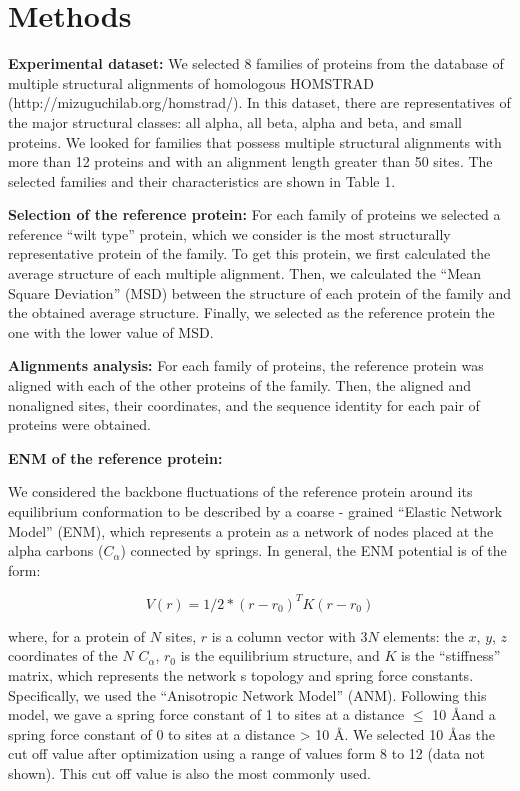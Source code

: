 \documentclass{article}
\begin{document}
\section{Methods}

{\bf Experimental dataset:}
We selected 8 families of proteins from the database of multiple structural alignments of homologous HOMSTRAD (http://mizuguchilab.org/homstrad/). In this dataset, there are representatives of the major structural classes: all alpha, all beta, alpha and beta, and small proteins. We looked for families that possess multiple structural alignments with more than 12 proteins and with an alignment length greater than 50 sites. The selected families and their characteristics are shown in Table 1.

{\bf Selection of the reference protein:}
For each family of proteins we selected a reference ``wilt type'' protein, which we consider is the most structurally representative protein of the family. To get this protein, we first calculated the average structure of each multiple alignment. Then, we calculated the ``Mean Square Deviation'' (MSD) between the structure of each protein of the family and the obtained average structure. Finally, we selected as the reference protein the one with the lower value of MSD.

{\bf Alignments analysis:}
For each family of proteins, the reference protein was aligned with each of the other proteins of the family. Then, the aligned and nonaligned sites, their coordinates, and the sequence identity for each pair of proteins were obtained. 

{\bf ENM of the reference protein:} 

We considered the backbone fluctuations of the reference protein around its equilibrium conformation to be described by a coarse - grained ``Elastic Network Model'' (ENM), which represents a protein as a network of nodes placed at the alpha carbons ($C_{\alpha}$) connected by springs. In general, the ENM potential is of the form: 

\begin{equation}
V(r) = 1/2*(r-r_{0})^{T}K(r-r_{0})
\end{equation}

where, for a protein of $N$ sites, $r$ is a column vector with $3N$ elements: the $x$, $y$, $z$ coordinates of the $N$ $C_{\alpha}$, $r_{0}$ is the equilibrium structure, and $K$ is the ``stiffness'' matrix, which represents the network\textsc{} s topology and spring force constants. 
Specifically, we used the ``Anisotropic Network Model'' (ANM). Following this model, we gave a spring force constant of 1 to sites at a distance $\leq$ 10 \AA  and a spring force constant of 0 to sites at a distance > 10 \AA. We selected 10 \AA  as the cut off value after optimization using a range of values form 8 to 12 (data not shown). This cut off value is also the most commonly used. 
\end{document}
